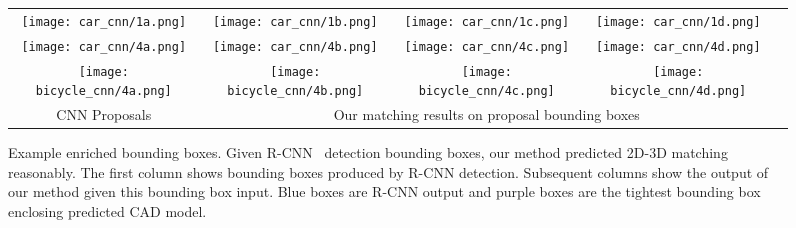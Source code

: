 \begin{figure*}[t]
\setlength\tabcolsep{1pt}
\centering
\begin{tabular}{|ccccc|}
   \hline
  \texttt{[image: car\_cnn/1a.png]} &   
  \texttt{[image: car\_cnn/1b.png]} &   
  \texttt{[image: car\_cnn/1c.png]} &   
  \texttt{[image: car\_cnn/1d.png]}  \\  
  \texttt{[image: car\_cnn/4a.png]} &   
  \texttt{[image: car\_cnn/4b.png]} &   
  \texttt{[image: car\_cnn/4c.png]} &   
  \texttt{[image: car\_cnn/4d.png]}  \\  
%
  \texttt{[image: bicycle\_cnn/4a.png]} &   
  \texttt{[image: bicycle\_cnn/4b.png]} &   
  \texttt{[image: bicycle\_cnn/4c.png]} &   
  \texttt{[image: bicycle\_cnn/4d.png]}  \\
  \hline
  CNN Proposals & \multicolumn{3}{|c|}{Our matching results on proposal bounding boxes} \\
  \hline
\end{tabular}
\caption{Example enriched bounding boxes. Given R-CNN~\cite{Girshick14}
  detection bounding boxes, our method predicted 2D-3D matching
  reasonably. The first column shows bounding boxes produced by R-CNN detection. Subsequent columns show the output of our method given this bounding box input. Blue boxes are R-CNN output and purple boxes are
  the tightest bounding box enclosing predicted CAD model.}
  \label{fig:pascal12cnn}
\end{figure*}
